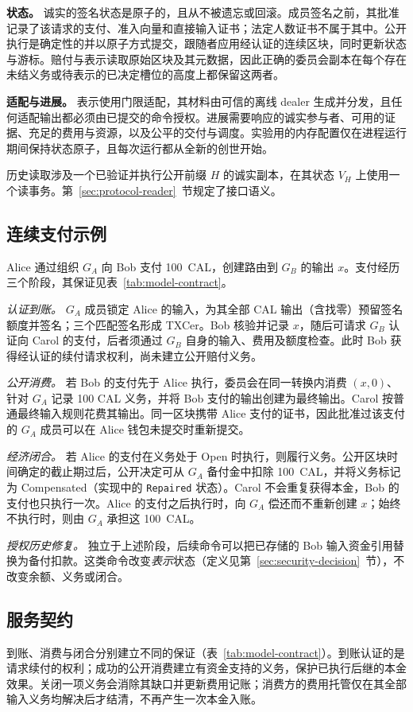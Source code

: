 \noindent\textbf{状态。}
诚实的签名状态是原子的，且从不被遗忘或回滚。成员签名之前，其批准记录了该请求的支付、准入向量和直接输入证书；法定人数证书不属于其中。公开执行是确定性的并以原子方式提交，跟随者应用经认证的连续区块，同时更新状态与游标。赔付与表示读取原始区块及其元数据，因此正确的委员会副本在每个存在未结义务或待表示的已决定槽位的高度上都保留这两者。

\noindent\textbf{适配与进展。}
表示使用门限适配，其材料由可信的离线 dealer 生成并分发，且任何适配输出都必须由已提交的命令授权。进展需要响应的诚实参与者、可用的证据、充足的费用与资源，以及公平的交付与调度。实验用的内存配置仅在进程运行期间保持状态原子，且每次运行都从全新的创世开始。

历史读取涉及一个已验证并执行公开前缀 $H$ 的诚实副本，在其状态 $V_H$ 上使用一个读事务。第~\ref{sec:protocol-reader}~节规定了接口语义。

\subsection{连续支付示例}
\label{sec:model-example}
Alice 通过组织 $G_A$ 向 Bob 支付 100~CAL，创建路由到 $G_B$ 的输出 $x$。支付经历三个阶段，其保证见表~\ref{tab:model-contract}。

\emph{认证到账。} $G_A$ 成员锁定 Alice 的输入，为其全部 CAL 输出（含找零）预留签名额度并签名；三个匹配签名形成 TXCer。Bob 核验并记录 $x$，随后可请求 $G_B$ 认证向 Carol 的支付，后者须通过 $G_B$ 自身的输入、费用及额度检查。此时 Bob 获得经认证的续付请求权利，尚未建立公开赔付义务。

\emph{公开消费。} 若 Bob 的支付先于 Alice 执行，委员会在同一转换内消费 $(x,0)$、针对 $G_A$ 记录 100 CAL 义务，并将 Bob 支付的输出创建为最终输出。Carol 按普通最终输入规则花费其输出。同一区块携带 Alice 支付的证书，因此批准过该支付的 $G_A$ 成员可以在 Alice 钱包未提交时重新提交。

\emph{经济闭合。} 若 Alice 的支付在义务处于 Open 时执行，则履行义务。公开区块时间确定的截止期过后，公开决定可从 $G_A$ 备付金中扣除 100~CAL，并将义务标记为 Compensated（实现中的 \texttt{Repaired} 状态）。Carol 不会重复获得本金，Bob 的支付也只执行一次。Alice 的支付之后执行时，向 $G_A$ 偿还而不重新创建 $x$；始终不执行时，则由 $G_A$ 承担这 100~CAL。

\emph{授权历史修复。} 独立于上述阶段，后续命令可以把已存储的 Bob 输入资金引用替换为备付扣款。这类命令改变\emph{表示}状态（定义见第~\ref{sec:security-decision}~节），不改变余额、义务或闭合。


\subsection{服务契约}
\label{sec:model-contract}
到账、消费与闭合分别建立不同的保证（表~\ref{tab:model-contract}）。到账认证的是请求续付的权利；成功的公开消费建立有资金支持的义务，保护已执行后继的本金效果。关闭一项义务会消除其缺口并更新费用记账；消费方的费用托管仅在其全部输入义务均解决后才结清，不再产生一次本金入账。

